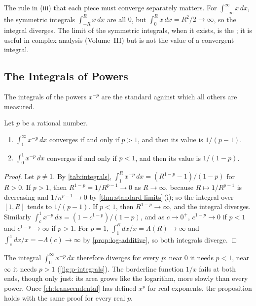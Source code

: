 The rule in (iii) that each piece must converge separately matters. For $\int_{-\infty}^\infty x\,dx$, the symmetric integrals $\int_{-R}^Rx\,dx$ are all $0$, but $\int_0^Rx\,dx=R^2/2\to\infty$, so the integral diverges. The limit of the symmetric integrals, when it exists, is the ; it is useful in complex analysis (Volume~III) but is not the value of a convergent integral.

\subsection{The Integrals of Powers}

The integrals of the powers $x^{-p}$ are the standard against which all others are measured.

\begin{proposition}
\label{prop:p-integrals}
Let $p$ be a rational number.
\begin{enumerate}
\item $\int_1^\infty x^{-p}\,dx$ converges if and only if $p>1$, and then its value is $1/(p-1)$.
\item $\int_0^1x^{-p}\,dx$ converges if and only if $p<1$, and then its value is $1/(1-p)$.
\end{enumerate}
\end{proposition}

\begin{proof}
Let $p\ne1$. By \cref{tab:integrals}, $\int_1^Rx^{-p}\,dx=(R^{1-p}-1)/(1-p)$ for $R>0$. If $p>1$, then $R^{1-p}=1/R^{p-1}\to0$ as $R\to\infty$, because $R\mapsto1/R^{p-1}$ is decreasing and $1/n^{p-1}\to0$ by \cref{thm:standard-limits}\,(i); so the integral over $[1,R]$ tends to $1/(p-1)$. If $p<1$, then $R^{1-p}\to\infty$, and the integral diverges. Similarly $\int_c^1x^{-p}\,dx=(1-c^{1-p})/(1-p)$, and as $c\to0^+$, $c^{1-p}\to0$ if $p<1$ and $c^{1-p}\to\infty$ if $p>1$. For $p=1$, $\int_1^R dx/x=\Lambda(R)\to\infty$ and $\int_c^1dx/x=-\Lambda(c)\to\infty$ by \cref{prop:log-additive}, so both integrals diverge.
\end{proof}

The integral $\int_0^\infty x^{-p}\,dx$ therefore diverges for every $p$: near $0$ it needs $p<1$, near $\infty$ it needs $p>1$ (\cref{fig:p-integrals}). The borderline function $1/x$ fails at both ends, though only just: its area grows like the logarithm, more slowly than every power. Once \cref{ch:transcendental} has defined $x^p$ for real exponents, the proposition holds with the same proof for every real $p$.

